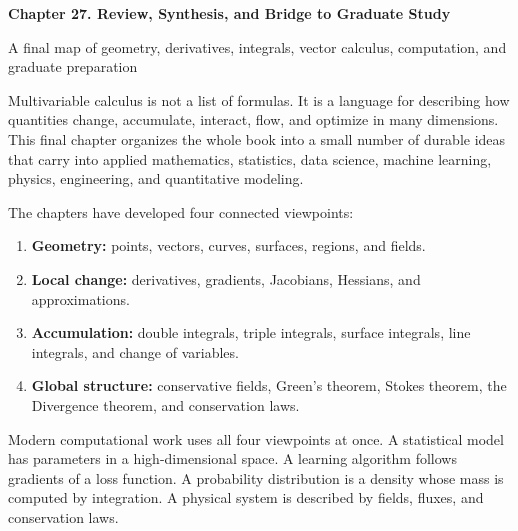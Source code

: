 \documentclass[11pt]{article}
\begin{document}
\begin{center}
  {\LARGE\bfseries Chapter 27. Review, Synthesis, and Bridge to Graduate Study\par}
  \vspace{0.35em}
  {\large A final map of geometry, derivatives, integrals, vector calculus, computation, and graduate preparation\par}
\end{center}

\begin{chapteroverviewbox}
Multivariable calculus is not a list of formulas. It is a language for describing how quantities change, accumulate, interact, flow, and optimize in many dimensions. This final chapter organizes the whole book into a small number of durable ideas that carry into applied mathematics, statistics, data science, machine learning, physics, engineering, and quantitative modeling.

The chapters have developed four connected viewpoints:
\begin{enumerate}
  \item \textbf{Geometry:} points, vectors, curves, surfaces, regions, and fields.
  \item \textbf{Local change:} derivatives, gradients, Jacobians, Hessians, and approximations.
  \item \textbf{Accumulation:} double integrals, triple integrals, surface integrals, line integrals, and change of variables.
  \item \textbf{Global structure:} conservative fields, Green's theorem, Stokes theorem, the Divergence theorem, and conservation laws.
\end{enumerate}
Modern computational work uses all four viewpoints at once. A statistical model has parameters in a high-dimensional space. A learning algorithm follows gradients of a loss function. A probability distribution is a density whose mass is computed by integration. A physical system is described by fields, fluxes, and conservation laws.
\end{chapteroverviewbox}
\end{document}
